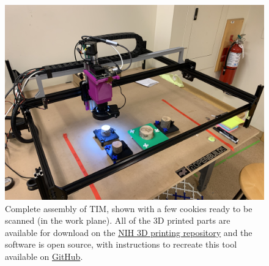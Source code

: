 \documentclass[a4paper,12pt]{article}
\begin{document}
\begin{figure}
  \centering
  \includegraphics[height=0.5\linewidth]{../content/tina.jpg}
  \caption{Complete assembly of TIM, shown with a few cookies ready to be scanned (in the work plane). All of the 3D printed parts are available for download on the \href{https://doi.org/10.60705/3DPX/21561.3}{NIH 3D printing repository} and the software is  
open source, with instructions to recreate this tool available on \href{https://github.com/temporalecologylab/TreeRings}{GitHub}. } %
  \label{fig:tim_assembled}
\end{figure}
\end{document}
